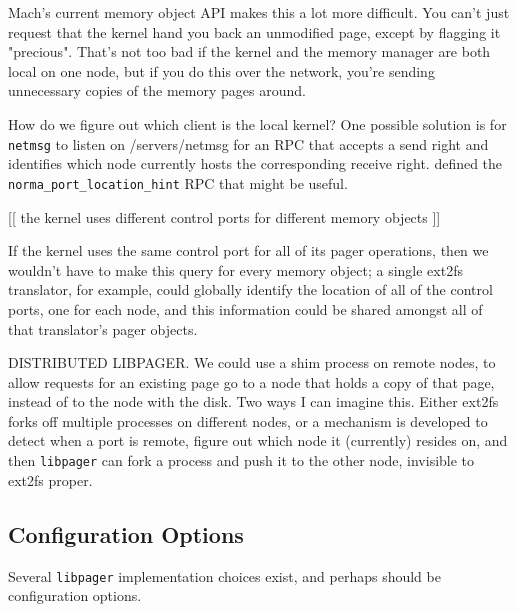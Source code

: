 \documentclass{article}
\def\libpager{{\tt libpager}\xspace}
\def\netmsg{{\tt netmsg}\xspace}
\begin{document}
Mach's current memory object API makes this a lot more difficult.  You
can't just request that the kernel hand you back an unmodified page,
except by flagging it "precious".  That's not too bad if the kernel
and the memory manager are both local on one node, but if you do this
over the network, you're sending unnecessary copies of the memory
pages around.

How do we figure out which client is the local kernel?  One possible
solution is for \netmsg to listen on /servers/netmsg for an RPC that
accepts a send right and identifies which node currently hosts the
corresponding receive right.  \cite{interfaces} defined the {\tt
  norma_port_location_hint} RPC that might be useful.

[[ the kernel uses different control ports for different memory objects ]]

  If the kernel uses the same control port for all of its pager
  operations, then we wouldn't have to make this query for every memory
  object; a single ext2fs translator, for example, could globally
  identify the location of all of the control ports, one for each node,
  and this information could be shared amongst all of that translator's
  pager objects.

DISTRIBUTED LIBPAGER.  We could use a shim process on remote nodes, to
allow requests for an existing page go to a node that holds a copy of
that page, instead of to the node with the disk.  Two ways I can
imagine this.  Either ext2fs forks off multiple processes on different
nodes, or a mechanism is developed to detect when a port is remote,
figure out which node it (currently) resides on, and then \libpager can
fork a process and push it to the other node, invisible to ext2fs
proper.


\subsection{Configuration Options}

Several \libpager implementation choices exist, and perhaps should be configuration options.
\end{document}
